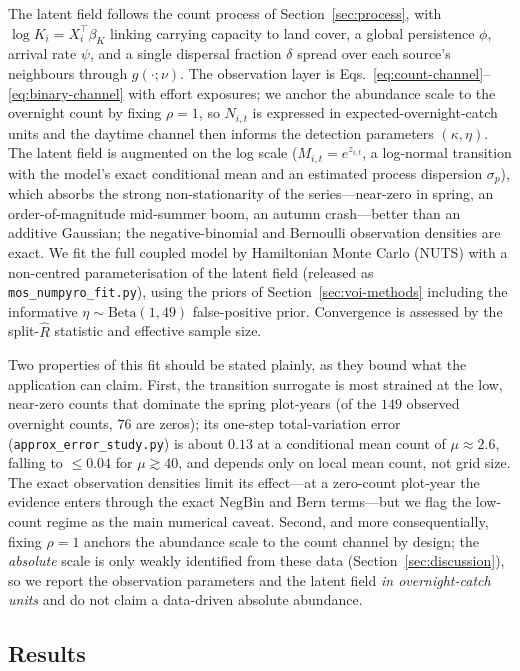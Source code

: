 \documentclass[preprint,12pt]{elsarticle}
\theoremstyle{definition}
\begin{document}
The latent field follows the count process of Section~\ref{sec:process}, with
$\log K_i = X_i^\top\beta_K$ linking carrying capacity to land cover, a global
persistence $\phi$, arrival rate $\psi$, and a single dispersal fraction
$\delta$ spread over each source's neighbours through $g(\cdot;\nu)$. The
observation layer is Eqs.~\eqref{eq:count-channel}--\eqref{eq:binary-channel}
with effort exposures; we anchor the abundance scale to the overnight count by
fixing $\rho=1$, so $N_{i,t}$ is expressed in expected-overnight-catch units and
the daytime channel then informs the detection parameters $(\kappa,\eta)$.
The latent field is augmented on the log scale ($M_{i,t}=e^{z_{i,t}}$, a
log-normal transition with the model's exact conditional mean and an estimated
process dispersion $\sigma_p$), which absorbs the strong non-stationarity of the
series---near-zero in spring, an order-of-magnitude mid-summer boom, an autumn
crash---better than an additive Gaussian; the negative-binomial and Bernoulli
observation densities are exact. We fit the full coupled model by Hamiltonian
Monte Carlo (NUTS) with a non-centred parameterisation of the latent field
(released as \texttt{mos\_numpyro\_fit.py}), using the priors of
Section~\ref{sec:voi-methods} including the informative
$\eta\sim\mathrm{Beta}(1,49)$ false-positive prior. Convergence is assessed by
the split-$\widehat R$ statistic and effective sample size.

Two properties of this fit should be stated plainly, as they bound what the
application can claim. First, the transition surrogate is most strained at the
low, near-zero counts that dominate the spring plot-years (of the $149$ observed
overnight counts, $76$ are zeros); its one-step total-variation error
(\texttt{approx\_error\_study.py}) is about $0.13$ at a conditional mean count of
$\mu\!\approx\!2.6$, falling to $\le\!0.04$ for $\mu\!\gtrsim\!40$, and depends
only on local mean count, not grid size. The exact observation densities limit
its effect---at a zero-count plot-year the evidence enters through the exact
$\mathrm{NegBin}$ and $\mathrm{Bern}$ terms---but we flag the low-count regime as
the main numerical caveat. Second, and more consequentially, fixing $\rho=1$
anchors the abundance scale to the count channel by design; the \emph{absolute}
scale is only weakly identified from these data (Section~\ref{sec:discussion}),
so we report the observation parameters and the latent field \emph{in
overnight-catch units} and do not claim a data-driven absolute abundance.

\subsection{Results}
\label{sec:neon-results}
\end{document}
